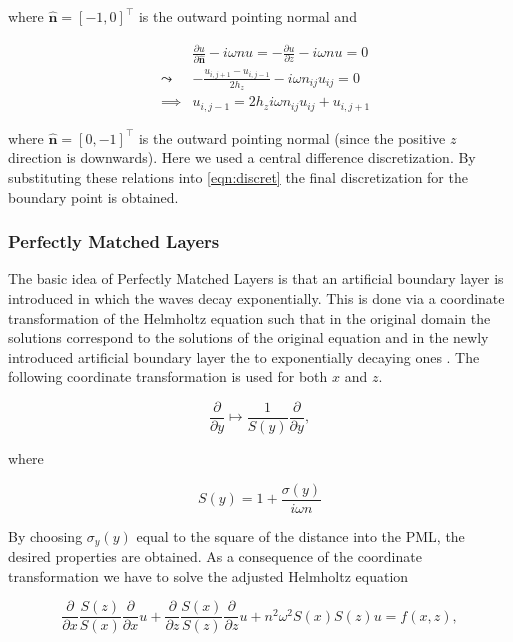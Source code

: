 \documentclass[10pt,a4paper]{article}
\newcommand{\n}{\mathbf{n}}
\begin{document}
where $\hat{\n}=[-1,0]^\top$ is the outward pointing normal and 

\begin{eqnarray}
&& \frac{\partial u}{\partial \hat{\n}} - i\omega nu = -\frac{\partial u}{\partial z} - i\omega nu =0\\
&\leadsto& -\frac{u_{i,j+1}-u_{i,j-1}}{2h_z}-i\omega n_{ij} u_{ij}=0\\
&\implies& u_{i,j-1} = 2h_zi\omega n_{ij}u_{ij}+u_{i,j+1}
\end{eqnarray}

where $\hat{\n}=[0,-1]^\top$ is the outward pointing normal (since the positive $z$ direction is downwards). Here we used a central difference discretization. By substituting these relations into \cref{eqn:discret} the final discretization for the boundary point is obtained. 

\subsubsection{Perfectly Matched Layers}
The basic idea of Perfectly Matched Layers is that an artificial boundary layer is introduced in which the waves decay exponentially. This is done via a coordinate transformation of the Helmholtz equation such that in the original domain the solutions correspond to the solutions of the original equation and in the newly introduced artificial boundary layer the to exponentially decaying ones \cite{Erlangga2008}. The following coordinate transformation is used for both $x$ and $z$.

\begin{equation}
\frac{\partial }{\partial y} \mapsto \frac{1}{S(y)}\frac{\partial}{\partial y},
\end{equation}

where 

\begin{equation}
S(y)=1+\frac{\sigma(y)}{i\omega n}
\end{equation}

By choosing $\sigma_y(y)$ equal to the square of the distance into the PML, the desired properties are obtained. As a consequence of the coordinate transformation we have to solve the adjusted Helmholtz equation

\begin{equation} \label{eqn:PMLHelmholtz}
\frac{\partial }{\partial x}\frac{S(z)}{S(x)}\frac{\partial }{\partial x}u + \frac{\partial }{\partial z}\frac{S(x)}{S(z)}\frac{\partial }{\partial z}u + n^2\omega^2 S(x)S(z)u=f(x,z),
\end{equation}
\end{document}
